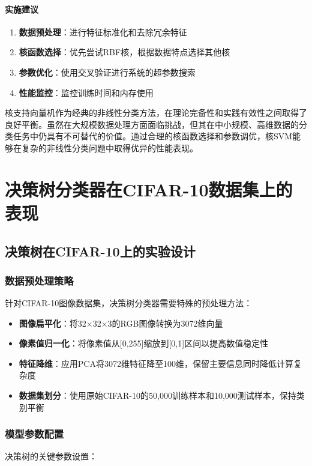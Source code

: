\documentclass[UTF8]{report}
\theoremstyle{MyLineTheoremStyle} %
\theoremstyle{MyBlockTheoremStyle} %
\theoremstyle{MySubsubsectionStyle} %
\begin{document}
\paragraph{实施建议}
\begin{enumerate}[label=\arabic*.]
    \item \textbf{数据预处理}：进行特征标准化和去除冗余特征
    \item \textbf{核函数选择}：优先尝试RBF核，根据数据特点选择其他核
    \item \textbf{参数优化}：使用交叉验证进行系统的超参数搜索
    \item \textbf{性能监控}：监控训练时间和内存使用
\end{enumerate}


核支持向量机作为经典的非线性分类方法，在理论完备性和实践有效性之间取得了良好平衡。虽然在大规模数据处理方面面临挑战，但其在中小规模、高维数据的分类任务中仍具有不可替代的价值。通过合理的核函数选择和参数调优，核SVM能够在复杂的非线性分类问题中取得优异的性能表现。




\section{决策树分类器在CIFAR-10数据集上的表现}

\subsection{决策树在CIFAR-10上的实验设计}

\subsubsection{数据预处理策略}
针对CIFAR-10图像数据集，决策树分类器需要特殊的预处理方法：

\begin{itemize}
    \item \textbf{图像扁平化}：将32×32×3的RGB图像转换为3072维向量
    \item \textbf{像素值归一化}：将像素值从[0,255]缩放到[0,1]区间以提高数值稳定性
    \item \textbf{特征降维}：应用PCA将3072维特征降至100维，保留主要信息同时降低计算复杂度
    \item \textbf{数据集划分}：使用原始CIFAR-10的50,000训练样本和10,000测试样本，保持类别平衡
\end{itemize}

\subsubsection{模型参数配置}
决策树的关键参数设置：
\end{document}
